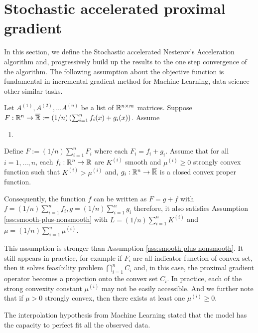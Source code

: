 \documentclass[12pt]{article}
\begin{document}
\section{Stochastic accelerated proximal gradient}
    In this section, we define the Stochastic accelerated Nesterov's Acceleration algorithm and, progressively build up the results to the one step convergence of the algorithm. 
    The following assumption about the objective function is fundamental in incremental gradient method for Machine Learning, data science other similar tasks. 
    \begin{assumption}\label{ass:sum-of-many-aff-comp}
        Let $A^{(1)}, A^{(2)}, \ldots A^{(n)}$ be a list of $\mathbb R^{n\times m}$ matrices. 
        Suppose $F:\mathbb R^n \rightarrow \overline {\mathbb R}:= (1/n)\left(\sum_{i = 1}^{n} f_i(x) + g_i(x)\right)$. 
        Assume
        \begin{enumerate}
            \item 
        \end{enumerate}
    \end{assumption}
    \begin{assumption}\label{ass:sum-of-many}
        Define $F := (1/n)\sum_{i = 1}^{n} F_i$ where each $F_i = f_i + g_i$.
        Assume that for all $i = 1, \ldots, n$, each $f_i:\mathbb R^n \rightarrow \mathbb R$ are $K^{(i)}$ smooth and $\mu^{(i)} \ge 0$ strongly convex function such that $K^{(i)} > \mu^{(i)}$ and, $g_i:\mathbb R^n \rightarrow \overline {\mathbb R}$ is a closed convex proper function. 
        \par 
        Consequently, the function $f$ can be written as $F = g + f$ with $f = (1/n)\sum_{i = 1}^{n} f_i, g = (1/n)\sum_{i = 1}^{n}g_i$ therefore, it also satisfies Assumption \ref{ass:smooth-plus-nonsmooth} with $L = (1/n)\sum_{i = 1}^n K^{(i)}$ and $\mu = (1/n)\sum_{i = 1}^{n}\mu^{(i)}$. 
    \end{assumption}
    This assumption is stronger than Assumption \ref{ass:smooth-plus-nonsmooth}. 
    It still appears in practice, for example if $F_i$ are all indicator function of convex set, then it solves feasibility problem $\bigcap_{i = 1}^n C_i$ and, in this case, the proximal gradient operator becomes a projection onto the convex set $C_i$. 
    In practice, each of the strong convexity constant $\mu^{(i)}$ may not be easily accessible. 
    And we further note that if $\mu > 0$ strongly convex, then there exists at least one $\mu^{(i)} \ge 0$. 
    \par
    The interpolation hypothesis from Machine Learning stated that the model has the capacity to perfect fit all the observed data. 
\end{document}
